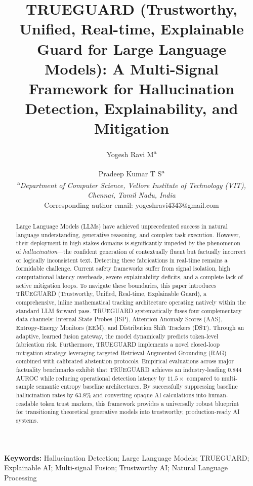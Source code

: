 \documentclass{article}
\title{\textbf{TRUEGUARD (Trustworthy, Unified, Real-time, Explainable Guard for Large Language Models): A Multi-Signal Framework for Hallucination Detection, Explainability, and Mitigation}}
\author{
    Yogesh Ravi M\textsuperscript{a} \and Pradeep Kumar T S\textsuperscript{a} \\[6pt]
    \textsuperscript{a}\textit{Department of Computer Science, Vellore Institute of Technology (VIT),} \\
    \textit{Chennai, Tamil Nadu, India} \\[4pt]
    \small{Corresponding author email: yogeshravi4343@gmail.com}
}
\date{}
\begin{document}
\maketitle

\begin{abstract}
\noindent
Large Language Models (LLMs) have achieved unprecedented success in natural language understanding, generative reasoning, and complex task execution. However, their deployment in high-stakes domains is significantly impeded by the phenomenon of \textit{hallucination}---the confident generation of contextually fluent but factually incorrect or logically inconsistent text. Detecting these fabrications in real-time remains a formidable challenge. Current safety frameworks suffer from signal isolation, high computational latency overheads, severe explainability deficits, and a complete lack of active mitigation loops. To navigate these boundaries, this paper introduces TRUEGUARD (Trustworthy, Unified, Real-time, Explainable Guard), a comprehensive, inline mathematical tracking architecture operating natively within the standard LLM forward pass. TRUEGUARD systematically fuses four complementary data channels: Internal State Probes (ISP), Attention Anomaly Scores (AAS), Entropy-Energy Monitors (EEM), and Distribution Shift Trackers (DST). Through an adaptive, learned fusion gateway, the model dynamically predicts token-level fabrication risk. Furthermore, TRUEGUARD implements a novel closed-loop mitigation strategy leveraging targeted Retrieval-Augmented Grounding (RAG) combined with calibrated abstention protocols. Empirical evaluations across major factuality benchmarks exhibit that TRUEGUARD achieves an industry-leading 0.844 AUROC while reducing operational detection latency by $11.5\times$ compared to multi-sample semantic entropy baseline architectures. By successfully suppressing baseline hallucination rates by $63.8\%$ and converting opaque AI calculations into human-readable token trust markers, this framework provides a universally robust blueprint for transitioning theoretical generative models into trustworthy, production-ready AI systems.
\end{abstract}

\noindent\textbf{Keywords:} Hallucination Detection; Large Language Models; TRUEGUARD; Explainable AI; Multi-signal Fusion; Trustworthy AI; Natural Language Processing
\end{document}
